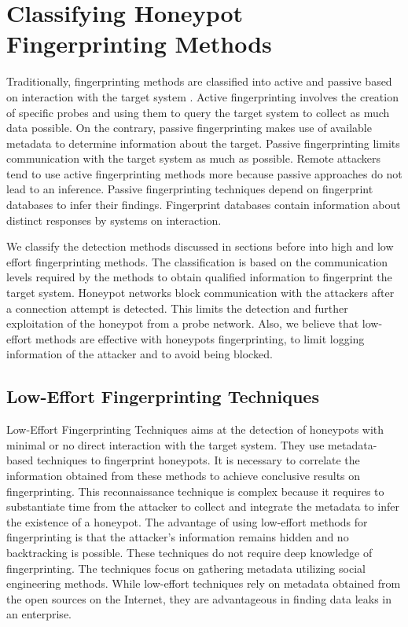 \section{Classifying Honeypot Fingerprinting Methods}
\label{sec:chfm}

Traditionally, fingerprinting methods are classified into active and passive based on interaction with the target system \cite{spitzner}. Active fingerprinting involves the creation of specific probes and using them to query the target system to collect as much data possible. On the contrary, passive fingerprinting makes use of available metadata to determine information about the target. Passive fingerprinting limits communication with the target system as much as possible. Remote attackers tend to use active fingerprinting methods more because passive approaches do not lead to an inference. Passive fingerprinting techniques depend on fingerprint databases to infer their findings. Fingerprint databases contain information about distinct responses by systems on interaction.
   
We classify the detection methods discussed in sections before into high and low effort fingerprinting methods. The classification is based on the communication levels required by the methods to obtain qualified information to fingerprint the target system. Honeypot networks block communication with the attackers after a connection attempt is detected. This limits the detection and further exploitation of the honeypot from a probe network. Also, we believe that low-effort methods are effective with honeypots fingerprinting, to limit logging information of the attacker and to avoid being blocked. 

 \subsection{Low-Effort Fingerprinting Techniques}
 Low-Effort Fingerprinting Techniques aims at the detection of honeypots with minimal or no direct interaction with the target system. They use metadata-based techniques to fingerprint honeypots. It is necessary to correlate the information obtained from these methods to achieve conclusive results on fingerprinting. This reconnaissance technique is complex because it requires to substantiate time from the attacker to collect and integrate the metadata to infer the existence of a honeypot. The advantage of using low-effort methods for fingerprinting is that the attacker's information remains hidden and no backtracking is possible. These techniques do not require deep knowledge of fingerprinting. The techniques focus on gathering metadata utilizing social engineering methods. While low-effort techniques rely on metadata obtained from the open sources on the Internet, they are advantageous in finding data leaks in an enterprise. 
 
